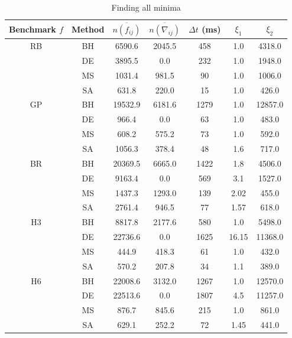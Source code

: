 \begin{table}
    \center
    \caption{Finding all minima}
    \label{table:compare-all}
    \footnotesize
    \begin{tabular}{cc|ccccc}
        Benchmark $f$ & Method & $\overline{n(f_{ij})}$ & $\overline{n(\nabla_{ij})}$ & $\Delta t$ (ms) & $\xi_1$ & $\xi_2$  \\
        \hline
RB  & BH & 6590.6 & 2045.5 & 458 & 1.0 & 4318.0 \\
 & DE & 3895.5 & 0.0 & 232 & 1.0 & 1948.0 \\
 & MS & 1031.4 & 981.5 & 90 & 1.0 & 1006.0 \\
 & SA & 631.8 & 220.0 & 15 & 1.0 & 426.0 \\
\hline
GP  & BH & 19532.9 & 6181.6 & 1279 & 1.0 & 12857.0 \\
 & DE & 966.4 & 0.0 & 63 & 1.0 & 483.0 \\
 & MS & 608.2 & 575.2 & 73 & 1.0 & 592.0 \\
 & SA & 1056.3 & 378.4 & 48 & 1.6 & 717.0 \\
\hline
BR  & BH & 20369.5 & 6665.0 & 1422 & 1.8 & 4506.0 \\
 & DE & 9163.4 & 0.0 & 569 & 3.1 & 1527.0 \\
 & MS & 1437.3 & 1293.0 & 139 & 2.02 & 455.0 \\
 & SA & 2761.4 & 946.5 & 77 & 1.57 & 618.0 \\
\hline
H3  & BH & 8817.8 & 2177.6 & 580 & 1.0 & 5498.0 \\
 & DE & 22736.6 & 0.0 & 1625 & 16.15 & 11368.0 \\
 & MS & 444.9 & 418.3 & 61 & 1.0 & 432.0 \\
 & SA & 570.2 & 207.8 & 34 & 1.1 & 389.0 \\
\hline
H6  & BH & 22008.6 & 3132.0 & 1267 & 1.0 & 12570.0 \\
 & DE & 22513.6 & 0.0 & 1807 & 4.5 & 11257.0 \\
 & MS & 876.7 & 845.6 & 215 & 1.0 & 861.0 \\
 & SA & 629.1 & 252.2 & 72 & 1.45 & 441.0 \\
    \end{tabular}
\end{table}

